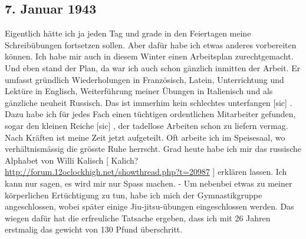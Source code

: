 \subsection{7. Januar 1943}

Eigentlich h\"{a}tte ich ja jeden Tag und grade in den Feiertagen meine Schreib\"{u}bungen fortsetzen sollen.
Aber daf\"{u}r habe ich etwas anderes vorbereiten k\"{o}nnen.
Ich habe mir auch in diesem Winter einen Arbeitsplan zurechtgemacht.
Und eben stand der Plan, da war ich auch schon g\"{a}nzlich inmitten der Arbeit.
Er umfasst gr\"{u}ndlich Wiederholungen in Franz\"{o}sisch, Latein, Unterrichtung und Lekt\"{u}re in Englisch, Weiterf\"{u}hrung meiner \"{U}bungen in Italienisch und als g\"{a}nzliche neuheit Russisch.
Das ist immerhim kein schlechtes unterfangen{\color{red} [sic] }.
Dazu habe ich f\"{u}r jedes Fach einen t\"{u}chtigen ordentlichen Mitarbeiter gefunden, sogar den kleinen Reiche {\color{red} [sic] }, der tadellose Arbeiten schon zu liefern vermag.
Nach Kr\"{a}ften ist meine Zeit jetzt aufgeteilt.
Oft arbeite ich im Speisesaal, wo verh\"{a}ltnism\"{a}ssig die gr\"{o}sste Ruhe herrscht.
Grad heute habe ich mir das russische Alphabet von Willi Kalisch{\color{red} [ Kalich? \url{http://forum.12oclockhigh.net/showthread.php?t=20987} ] } erkl\"{a}ren lassen.
Ich kann nur sagen, es wird mir nur Spass machen.
- Um nebenbei etwas zu meiner k\"{o}rperlichen Ert\"{u}chtigung zu tun, habe ich mich der Gymnastikgruppe angeschlossen, wobei sp\"{a}ter einige Jiu-jitsu-\"{u}bungen eingeschlossen werden.
Das wiegen daf\"{u}r hat die erfreuliche Tatsache ergeben, dass ich mit 26 Jahren erstmalig das gewicht von 130 Pfund \"{u}berschritt.

\clearpage
